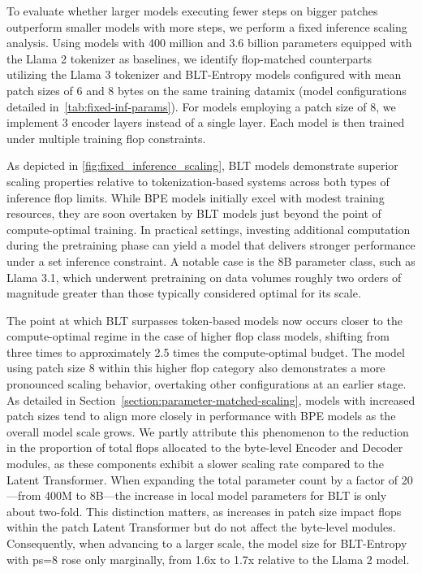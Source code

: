 To evaluate whether larger models executing fewer steps on bigger patches outperform smaller models with more steps, we perform a fixed inference scaling analysis. Using models with 400 million and 3.6 billion parameters equipped with the Llama 2 tokenizer as baselines, we identify flop-matched counterparts utilizing the Llama 3 tokenizer and {\textsc BLT}-Entropy models configured with mean patch sizes of 6 and 8 bytes on the same training datamix (model configurations detailed in~\autoref{tab:fixed-inf-params}). For models employing a patch size of 8, we implement 3 encoder layers instead of a single layer. Each model is then trained under multiple training flop constraints.

As depicted in \autoref{fig:fixed_inference_scaling}, {\textsc BLT} models demonstrate superior scaling properties relative to tokenization-based systems across both types of inference flop limits. While BPE models initially excel with modest training resources, they are soon overtaken by {\textsc BLT} models just beyond the point of compute-optimal training. In practical settings, investing additional computation during the pretraining phase can yield a model that delivers stronger performance under a set inference constraint. A notable case is the 8B parameter class, such as Llama 3.1, which underwent pretraining on data volumes roughly two orders of magnitude greater than those typically considered optimal for its scale.

The point at which {\textsc BLT} surpasses token-based models now occurs closer to the compute-optimal regime in the case of higher flop class models, shifting from three times to approximately 2.5 times the compute-optimal budget. The model using patch size 8 within this higher flop category also demonstrates a more pronounced scaling behavior, overtaking other configurations at an earlier stage. As detailed in Section~\ref{section:parameter-matched-scaling}, models with increased patch sizes tend to align more closely in performance with BPE models as the overall model scale grows. We partly attribute this phenomenon to the reduction in the proportion of total flops allocated to the byte-level Encoder and Decoder modules, as these components exhibit a slower scaling rate compared to the Latent Transformer. When expanding the total parameter count by a factor of 20—from 400M to 8B—the increase in local model parameters for {\textsc BLT} is only about two-fold. This distinction matters, as increases in patch size impact flops within the patch Latent Transformer but do not affect the byte-level modules. Consequently, when advancing to a larger scale, the model size for {\textsc BLT}-Entropy with ps=8 rose only marginally, from 1.6x to 1.7x relative to the Llama 2 model.

